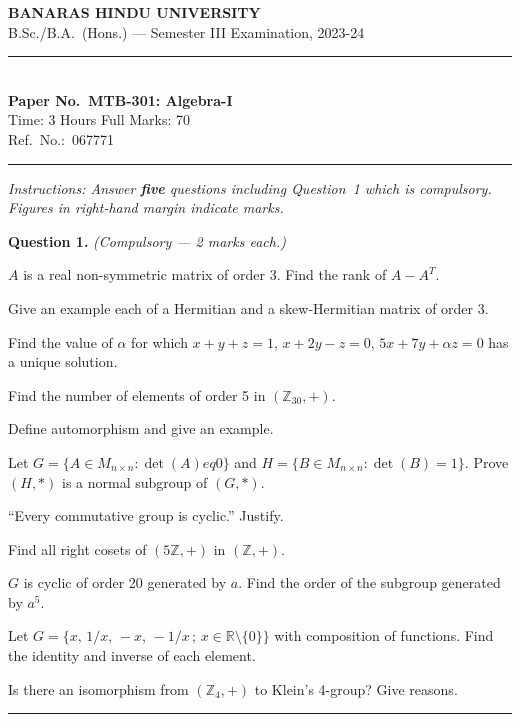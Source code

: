 \documentclass[11pt,a4paper]{article}
\begin{document}
\begin{center}
  {\large\bfseries BANARAS HINDU UNIVERSITY}\\[2pt]
  {\normalsize B.Sc./B.A.\ (Hons.) --- Semester III Examination, 2023-24}\\[6pt]
  \rule{0.8\linewidth}{0.5pt}\\[6pt]
  {\large\bfseries Paper No.\ MTB-301: Algebra-I}\\[4pt]
  {\normalsize Time: 3 Hours \hfill Full Marks: 70}\\[2pt]
  {\small Ref.\ No.:\ 067771}
\end{center}
\rule{\linewidth}{0.4pt}
\smallskip



\noindent   \textit{Instructions: Answer   \textbf{five} questions including Question~1 which is compulsory. Figures in right-hand margin indicate marks.}
\bigskip




\noindent   \textbf{Question 1.}   \textit{(Compulsory --- 2 marks each.)}

\begin{parts}
  \item $A$ is a real non-symmetric matrix of order 3. Find the rank of $A-A^T$.
  \item Give an example each of a Hermitian and a skew-Hermitian matrix of order 3.
  \item Find the value of $\alpha$ for which $x+y+z=1$, $x+2y-z=0$, $5x+7y+\alpha z=0$ has a unique solution.
  \item Find the number of elements of order 5 in $(\mathbb{Z}_{30},+)$.
  \item Define automorphism and give an example.
  \item Let $G=\{A\in M_{n \times n}:\det(A)
eq0\}$ and $H=\{B\in M_{n \times n}:\det(B)=1\}$. Prove $(H,*)$ is a normal subgroup of $(G,*)$.
  \item ``Every commutative group is cyclic.'' Justify.
  \item Find all right cosets of $(5\mathbb{Z},+)$ in $(\mathbb{Z},+)$.
  \item $G$ is cyclic of order 20 generated by $a$. Find the order of the subgroup generated by $a^5$.
  \item Let $G=\{x,\,1/x,\,-x,\,-1/x\,;\,x\in\mathbb{R}\setminus\{0\}\}$ with composition of functions. Find the identity and inverse of each element.
  \item Is there an isomorphism from $(\mathbb{Z}_4,+)$ to Klein's 4-group? Give reasons.
\end{parts}
\medskip\rule{\linewidth}{0.2pt}
\end{document}
